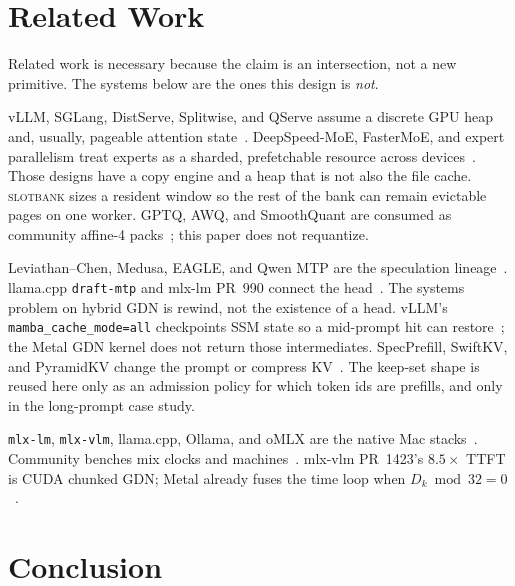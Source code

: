\documentclass[11pt]{article}
\theoremstyle{definition}
\newcommand{\slotbank}{\textsc{slotbank}}
\begin{document}
\section{Related Work}
\label{sec:related}

Related work is necessary because the claim is an intersection, not a new primitive. The systems below are the ones this design is \emph{not}.

vLLM, SGLang, DistServe, Splitwise, and QServe assume a discrete GPU heap and, usually, pageable attention state~\citep{kwon2023vllm,zheng2024sglang,zhong2024distserve,patel2024splitwise,lin2024qserve}. DeepSpeed-MoE, FasterMoE, and expert parallelism treat experts as a sharded, prefetchable resource across devices~\citep{rajbhandari2022deepspeed,he2022fastermoe}. Those designs have a copy engine and a heap that is not also the file cache. \slotbank{} sizes a resident window so the rest of the bank can remain evictable pages on one worker. GPTQ, AWQ, and SmoothQuant are consumed as community affine-4 packs~\citep{frantar2023gptq,lin2024awq,xiao2024smoothquant}; this paper does not requantize.

Leviathan--Chen, Medusa, EAGLE, and Qwen MTP are the speculation lineage~\citep{leviathan2023speculative,chen2023accelerating,cai2024medusa,li2024eagle,qwen3}. llama.cpp \texttt{draft-mtp} and mlx-lm PR~990 connect the head~\citep{ctaylor83mtp,mlxlm990}. The systems problem on hybrid GDN is rewind, not the existence of a head. vLLM’s \texttt{mamba\_cache\_mode=all} checkpoints SSM state so a mid-prompt hit can restore~\citep{vllm36649}; the Metal GDN kernel does not return those intermediates. SpecPrefill, SwiftKV, and PyramidKV change the prompt or compress KV~\citep{yuan2024specprefill,swiftkv,pyramidkv}. The keep-set shape is reused here only as an admission policy for which token ids are prefills, and only in the long-prompt case study.

\texttt{mlx-lm}, \texttt{mlx-vlm}, llama.cpp, Ollama, and oMLX are the native Mac stacks~\citep{mlx2023,mlxlm,mlxvlm,llamacpp,ollama019,omlx2874}. Community benches mix clocks and machines~\citep{terminalbytes2026,orcarouter2026,weschera2026,nathanmaine}. mlx-vlm PR~1423’s $8.5{\times}$ TTFT is CUDA chunked GDN; Metal already fuses the time loop when $D_k \bmod 32 = 0$~\citep{mlxvlm1423}.

\section{Conclusion}
\label{sec:conc}
\end{document}
